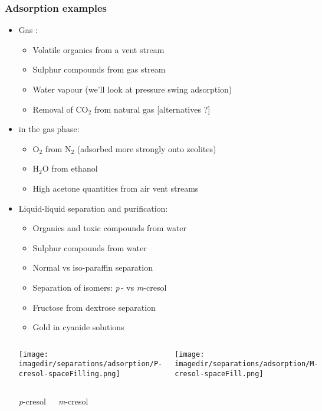 \begin{frame}\frametitle{Adsorption examples}
	\begin{itemize}
		\item	Gas {\color{purple}{purification}}:
		\begin{itemize}
			\item	Volatile organics from a vent stream
			\item	Sulphur compounds from gas stream
			\item	Water vapour (we'll look at pressure swing adsorption)
			\item	Removal of $\text{CO}_2$ from natural gas [alternatives ?]
		\end{itemize}
		\item	{\color{purple}{Bulk separation}} in the gas phase:
		\begin{itemize}
			\item	$\text{O}_2$ from $\text{N}_2$ (adsorbed more strongly onto zeolites) 
			\item	$\text{H}_2\text{O}$ from ethanol
			\item	High acetone quantities from air vent streams
		\end{itemize}
		\item	Liquid-liquid separation and purification:
		\begin{itemize}
			\item	Organics and toxic compounds from water
			\item	Sulphur compounds from water
			\item	Normal vs iso-paraffin separation
			\item	Separation of isomers: \emph{p}$\,$- vs \emph{m}-cresol
			\item	Fructose from dextrose separation
			\item	Gold in cyanide solutions
		\end{itemize}
		\vspace{-2.5cm}
		\begin{columns}[t]
				\begin{center}
					\texttt{[image: \\imagedir/separations/adsorption/P-cresol-spaceFilling.png]}
				\end{center}
				\begin{center}
					\texttt{[image: \\imagedir/separations/adsorption/M-cresol-spaceFill.png]}					
				\end{center}				
		\end{columns}
		\begin{columns}[t]
				\begin{center}
					\emph{p}-cresol
				\end{center}
				\begin{center}
					\emph{m}-cresol
				\end{center}
		\end{columns}
		\hfill{}
		
	\end{itemize}	
\end{frame}

